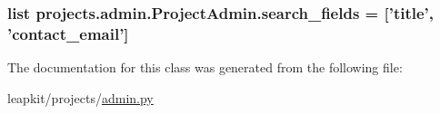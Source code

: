 \hypertarget{classprojects_1_1admin_1_1_project_admin_a02fd5dcdc2f73478870a2c63328910ae}{
\subsubsection[{search\-\_\-fields}]{\setlength{\rightskip}{0pt plus 5cm}list projects.\-admin.\-Project\-Admin.\-search\-\_\-fields = \mbox{[}'title', 'contact\-\_\-email'\mbox{]}\hspace{0.3cm}{\ttfamily [static]}}}\label{classprojects_1_1admin_1_1_project_admin_a02fd5dcdc2f73478870a2c63328910ae}


The documentation for this class was generated from the following file\-:\begin{DoxyCompactItemize}
\item 
leapkit/projects/\hyperlink{projects_2admin_8py}{admin.\-py}\end{DoxyCompactItemize}
